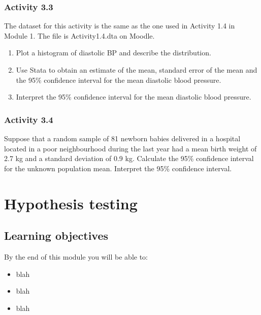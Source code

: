 \documentclass[
]{memoir}
\providecommand{\tightlist}{%
  \setlength{\itemsep}{0pt}\setlength{\parskip}{0pt}}
\begin{document}
\hypertarget{activity-3.3}{%
\subsection*{Activity 3.3}\label{activity-3.3}}

The dataset for this activity is the same as the one used in Activity 1.4 in Module 1. The file is Activity1.4.dta on Moodle.

\begin{enumerate}
\def\labelenumi{\alph{enumi})}
\tightlist
\item
  Plot a histogram of diastolic BP and describe the distribution.
\item
  Use Stata to obtain an estimate of the mean, standard error of the mean and the 95\% confidence interval for the mean diastolic blood pressure.
\item
  Interpret the 95\% confidence interval for the mean diastolic blood pressure.
\end{enumerate}

\hypertarget{activity-3.4}{%
\subsection*{Activity 3.4}\label{activity-3.4}}

Suppose that a random sample of 81 newborn babies delivered in a hospital located in a poor neighbourhood during the last year had a mean birth weight of 2.7 kg and a standard deviation of 0.9 kg. Calculate the 95\% confidence interval for the unknown population mean. Interpret the 95\% confidence interval.

\hypertarget{hypothesis-testing}{%
\chapter{Hypothesis testing}\label{hypothesis-testing}}

\hypertarget{learning-objectives-3}{%
\section*{Learning objectives}\label{learning-objectives-3}}

By the end of this module you will be able to:

\begin{itemize}
\tightlist
\item
  blah
\item
  blah
\item
  blah
\end{itemize}
\end{document}
